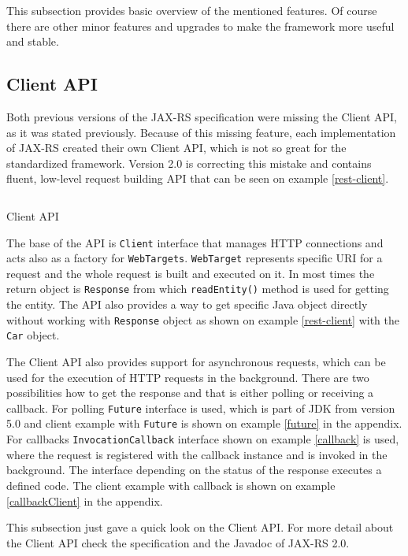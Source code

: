 \documentclass[12pt,final,oneside]{fithesis2}
\begin{document}
This subsection provides basic overview of the mentioned features. Of course there are other minor features and upgrades to make the framework more useful and stable.

\subsection*{Client API}\label{client-api}
Both previous versions of the JAX-RS specification were missing the Client API, as it was stated previously. Because of this missing feature, each implementation of JAX-RS created their own Client API, which is not so great for the standardized framework. Version 2.0 is correcting this mistake and contains fluent, low-level request building API that can be seen on example \ref{rest-client}. 

\begin{listing}[ht]
	\inputminted[]{java}{sources/client.java}
	\caption{Client API}
	\label{rest-client}
\end{listing}

The base of the API is \texttt{Client} interface that manages HTTP connections and acts also as a factory for \texttt{WebTargets}. \texttt{WebTarget} represents specific URI for a request and the whole request is built and executed on it. In most times the return object is \texttt{Response} from which \texttt{readEntity()} method is used for getting the entity. The API also provides a way to get specific Java object directly without working with \texttt{Response} object as shown on example \ref{rest-client} with the \texttt{Car} object.

The Client API also provides support for asynchronous requests, which can be used for the execution of HTTP requests in the background. There are two possibilities how to get the response and that is either polling or receiving a callback. For polling \texttt{Future} interface is used, which is part of JDK from version 5.0 and client example with \texttt{Future} is shown on example \ref{future} in the appendix. For callbacks \texttt{InvocationCallback} interface shown on example \ref{callback} is used, where the request is registered with the callback instance and is invoked in the background. The interface depending on the status of the response executes a defined code\cite{jax-rs-2.0-new}\cite{jax-rs-2.0}. The client example with callback is shown on example \ref{callbackClient} in  the appendix.

This subsection just gave a quick look on the Client API. For more detail about the Client API check the specification and the Javadoc of JAX-RS 2.0.
\end{document}

